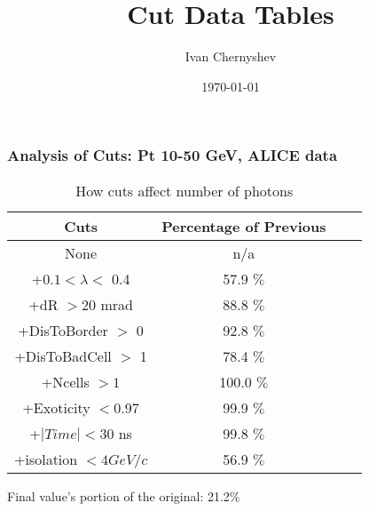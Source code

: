\documentclass{beamer}
\title{Cut Data Tables}
\author{Ivan Chernyshev}
\date{\today}
\begin{document}
 

\frame 
{ 
\frametitle{Analysis of Cuts: Pt 10-50 GeV, ALICE data } 
\begin{table} 
\caption{How cuts affect number of photons} 
\centering 
\begin{tabular}{c c c c} 
\hline\hline 
Cuts & Percentage of Previous\\ [0.5ex] 
\hline
None & n/a\\
+$0.1 < \lambda <$ 0.4 & 57.9 $\%$ \\
+dR $> 20$ mrad & 88.8 $\%$ \\
+DisToBorder $>$ 0 & 92.8 $\%$ \\
+DisToBadCell $>$ 1 & 78.4 $\%$ \\
+Ncells $> 1$ & 100.0 $\%$ \\
+Exoticity $< 0.97$ & 99.9 $\%$ \\
+$|Time| < 30$ ns & 99.8 $\%$ \\
+isolation $< 4 GeV/c$ & 56.9 $\%$ \\
[1ex] 
\hline 
\end{tabular} 
\label{table:nonlin} 
\end{table} 
 Final value's portion of the original: 21.2\%
 } 
\end{document}
